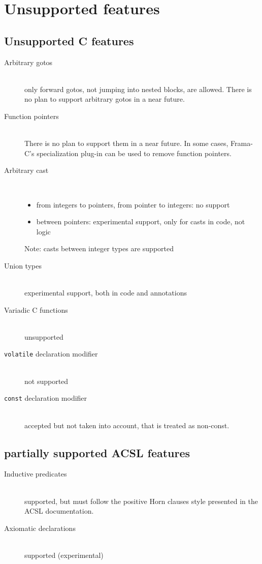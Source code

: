 \documentclass[a4paper,11pt,twoside,openright]{report}
\begin{document}
\section{Unsupported features}

\subsection{Unsupported C features}

\begin{description}
\item[Arbitrary gotos] ~\\
  only forward gotos, not jumping into nested
  blocks, are allowed. There is no plan to support arbitrary gotos in
  a near future.
\item[Function pointers] ~\\
  There is no plan to support them in a near
  future. In some cases, Frama-C's specialization plug-in can be used to
  remove function pointers.
\item[Arbitrary cast] ~\\
  \begin{itemize}
  \item from integers to pointers, from pointer to integers: no support
  \item between pointers: experimental support, only for casts in code, not logic
  \end{itemize}
  Note: casts between integer types are supported
\item[Union types] ~\\
  experimental support, both in code and annotations
\item[Variadic C functions] ~\\
  unsupported

\item[\texttt{volatile} declaration modifier]~\\
  not supported
\item[\texttt{const} declaration modifier]~\\
  accepted but not taken into account, that is treated as non-const.

\end{description}


\subsection{partially supported ACSL features}

\begin{description}
\item[Inductive predicates] ~\\
  supported, but must follow the positive
  Horn clauses style presented in the ACSL documentation.
\item[Axiomatic declarations] ~\\
  supported (experimental)
\end{description}
\end{document}
